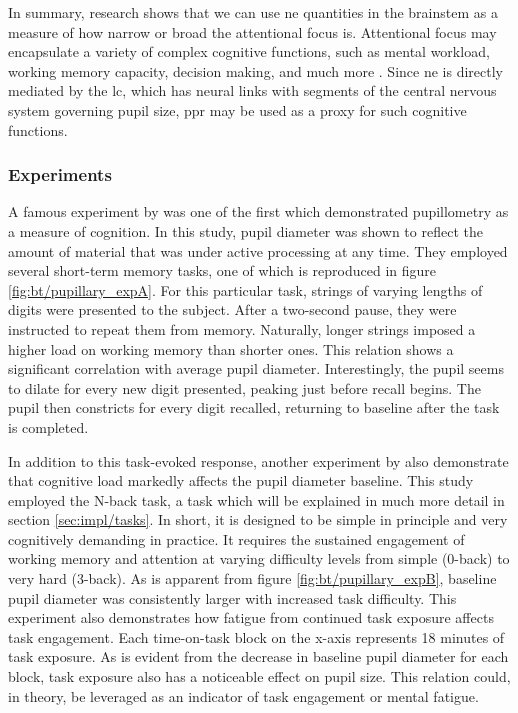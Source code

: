 In summary, research shows that we can use \acrshort{ne} quantities in the brainstem as a measure of how narrow or broad the attentional focus is. Attentional focus may encapsulate a variety of complex cognitive functions, such as mental workload, working memory capacity, decision making, and much more \cite{sara2009}. Since \acrshort{ne} is directly mediated by the \acrfull{lc}, which has neural links with segments of the central nervous system governing pupil size, \acrshort{ppr} may be used as a proxy for such cognitive functions.


\subsubsection{Experiments}

A famous experiment by \textcite{kahneman1966} was one of the first which demonstrated pupillometry as a measure of cognition. In this study, pupil diameter was shown to reflect the amount of material that was under active processing at any time. They employed several short-term memory tasks, one of which is reproduced in figure \ref{fig:bt/pupillary_expA}. For this particular task, strings of varying lengths of digits were presented to the subject. After a two-second pause, they were instructed to repeat them from memory. Naturally, longer strings imposed a higher load on working memory than shorter ones. This relation shows a significant correlation with average pupil diameter. Interestingly, the pupil seems to dilate for every new digit presented, peaking just before recall begins. The pupil then constricts for every digit recalled, returning to baseline after the task is completed. 

In addition to this task-evoked response, another experiment by \textcite{hopstaken2015} also demonstrate that cognitive load markedly affects the pupil diameter baseline. This study employed the N-back task, a task which will be explained in much more detail in section \ref{sec:impl/tasks}. In short, it is designed to be simple in principle and very cognitively demanding in practice. It requires the sustained engagement of working memory and attention at varying difficulty levels from simple (0-back) to very hard (3-back). As is apparent from figure \ref{fig:bt/pupillary_expB}, baseline pupil diameter was consistently larger with increased task difficulty. This experiment also demonstrates how fatigue from continued task exposure affects task engagement. Each time-on-task block on the x-axis represents 18 minutes of task exposure. As is evident from the decrease in baseline pupil diameter for each block, task exposure also has a noticeable effect on pupil size. This relation could, in theory, be leveraged as an indicator of task engagement or mental fatigue.

